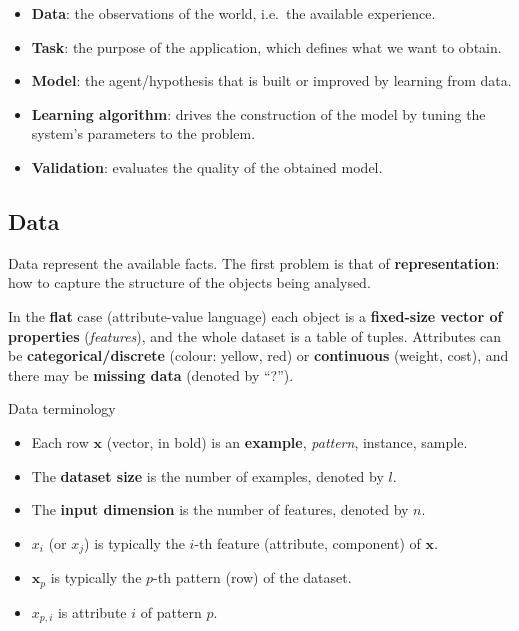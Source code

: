 \begin{itemize}
\tightlist
\item
  \textbf{Data}: the observations of the world, i.e.\ the available
  experience.
\item
  \textbf{Task}: the purpose of the application, which defines what we
  want to obtain.
\item
  \textbf{Model}: the agent/hypothesis that is built or improved by
  learning from data.
\item
  \textbf{Learning algorithm}: drives the construction of the model by
  tuning the system's parameters to the problem.
\item
  \textbf{Validation}: evaluates the quality of the obtained model.
\end{itemize}

\subsection{Data}\label{dati}

Data represent the available facts. The first problem is that of
\textbf{representation}: how to capture the structure of the objects
being analysed.

In the \textbf{flat} case (attribute-value language) each object is a
\textbf{fixed-size vector of properties} (\emph{features}), and the
whole dataset is a table of tuples. Attributes can be
\textbf{categorical/discrete} (colour: yellow, red) or
\textbf{continuous} (weight, cost), and there may be \textbf{missing
data} (denoted by ``?'').

\begin{boxnote}{Data terminology}

\begin{itemize}
\tightlist
\item
  Each row \(\mathbf{x}\) (vector, in bold) is an \textbf{example},
  \emph{pattern}, instance, sample.
\item
  The \textbf{dataset size} is the number of examples, denoted by
  \(l\).
\item
  The \textbf{input dimension} is the number of features, denoted by
  \(n\).
\item
  \(x_i\) (or \(x_j\)) is typically the \(i\)-th feature (attribute,
  component) of \(\mathbf{x}\).
\item
  \(\mathbf{x}_p\) is typically the \(p\)-th pattern (row) of the
  dataset.
\item
  \(x_{p,i}\) is attribute \(i\) of pattern \(p\).
\end{itemize}

\end{boxnote}

